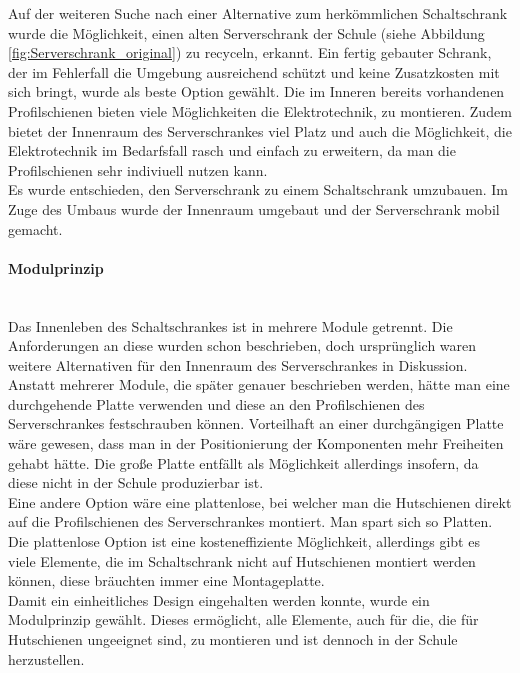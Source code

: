     Auf der weiteren Suche nach einer Alternative zum herkömmlichen Schaltschrank wurde die Möglichkeit, einen alten Serverschrank der Schule (siehe Abbildung \ref{fig:Serverschrank_original}) zu recyceln, erkannt. Ein fertig gebauter Schrank, der im Fehlerfall die Umgebung ausreichend schützt und keine Zusatzkosten mit sich bringt, wurde als beste Option gewählt. Die im Inneren bereits vorhandenen Profilschienen bieten viele Möglichkeiten die Elektrotechnik, zu montieren. Zudem bietet der Innenraum des Serverschrankes viel Platz und auch die Möglichkeit, die Elektrotechnik im Bedarfsfall rasch und einfach zu erweitern, da man die Profilschienen sehr indiviuell nutzen kann.\\
    Es wurde entschieden, den Serverschrank zu einem Schaltschrank umzubauen. Im Zuge des Umbaus wurde der Innenraum umgebaut und der Serverschrank mobil gemacht. 
    \paragraph{Modulprinzip}\mbox{}\\
    Das Innenleben des Schaltschrankes ist in mehrere Module getrennt. Die Anforderungen an diese wurden schon beschrieben, doch ursprünglich waren weitere Alternativen für den Innenraum des Serverschrankes in Diskussion.\\
    Anstatt mehrerer Module, die später genauer beschrieben werden, hätte man eine durchgehende Platte verwenden und diese an den Profilschienen des Serverschrankes festschrauben können. Vorteilhaft an einer durchgängigen Platte wäre gewesen, dass man in der Positionierung der Komponenten mehr Freiheiten gehabt hätte. Die große Platte entfällt als Möglichkeit allerdings insofern, da diese nicht in der Schule produzierbar ist.\\
    Eine andere Option wäre eine plattenlose, bei welcher man die Hutschienen direkt auf die Profilschienen des Serverschrankes montiert. Man spart sich so Platten. Die plattenlose Option ist eine kosteneffiziente Möglichkeit, allerdings gibt es viele Elemente, die im Schaltschrank nicht auf Hutschienen montiert werden können, diese bräuchten immer eine Montageplatte.\\
    Damit ein einheitliches Design eingehalten werden konnte, wurde ein Modulprinzip gewählt. Dieses ermöglicht, alle Elemente, auch für die, die für Hutschienen ungeeignet sind, zu montieren und ist dennoch in der Schule herzustellen.


